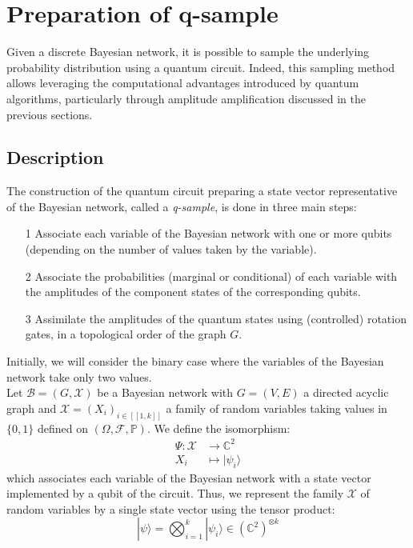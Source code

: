 \section{Preparation of q-sample}
\label{part4}

Given a discrete Bayesian network, it is possible to sample the underlying probability distribution using a quantum circuit. Indeed, this sampling method allows leveraging the computational advantages introduced by quantum algorithms, particularly through amplitude amplification discussed in the previous sections. \cite{borujeni2021quantum}

\subsection{Description}
The construction of the quantum circuit preparing a state vector representative of the Bayesian network, called a \textit{q-sample}, is done in three main steps:
\begin{itemize}
\item[1] Associate each variable of the Bayesian network with one or more qubits (depending on the number of values taken by the variable).
\item[2] Associate the probabilities (marginal or conditional) of each variable with the amplitudes of the component states of the corresponding qubits.
\item[3] Assimilate the amplitudes of the quantum states using (controlled) rotation gates, in a topological order of the graph $G$.
\end{itemize}
Initially, we will consider the binary case where the variables of the Bayesian network take only two values.
\\
Let $\mathcal{B} = (G,\mathcal{X})$ be a Bayesian network with $G=(V,E)$ a directed acyclic graph and $\mathcal{X}=(X_i)_{i\in[\![1,k]\!]}$ a family of random variables taking values in $\{0,1\}$ defined on $(\Omega, \mathcal{F}, \mathbb{P})$. We define the isomorphism:
\begin{align*}
    \Psi : \mathcal{X} &\longrightarrow \mathbb{C}^2\\
    X_i &\longmapsto |\psi_i\rangle
\end{align*}
which associates each variable of the Bayesian network with a state vector implemented by a qubit of the circuit. Thus, we represent the family $\mathcal{X}$ of random variables by a single state vector using the tensor product:
\[|\psi\rangle = \bigotimes_{i=1}^{k}|\psi_i\rangle \in (\mathbb{C}^2)^{\otimes k}\]
